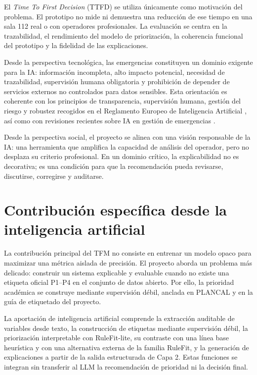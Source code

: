 El \textit{Time To First Decision} (TTFD) se utiliza únicamente como motivación del problema. El prototipo no mide ni demuestra una reducción de ese tiempo en una sala 112 real o con operadores profesionales. La evaluación se centra en la trazabilidad, el rendimiento del modelo de priorización, la coherencia funcional del prototipo y la fidelidad de las explicaciones.

Desde la perspectiva tecnológica, las emergencias constituyen un dominio exigente para la IA: información incompleta, alto impacto potencial, necesidad de trazabilidad, supervisión humana obligatoria y prohibición de depender de servicios externos no controlados para datos sensibles. Esta orientación es coherente con los principios de transparencia, supervisión humana, gestión del riesgo y robustez recogidos en el Reglamento Europeo de Inteligencia Artificial \cite{EUAIAct2024}, así como con revisiones recientes sobre IA en gestión de emergencias \cite{SAPEA2025,Ghaffarian2023}.

Desde la perspectiva social, el proyecto se alinea con una visión responsable de la IA: una herramienta que amplifica la capacidad de análisis del operador, pero no desplaza su criterio profesional. En un dominio crítico, la explicabilidad no es decorativa; es una condición para que la recomendación pueda revisarse, discutirse, corregirse y auditarse.

\section{Contribución específica desde la inteligencia artificial}

La contribución principal del TFM no consiste en entrenar un modelo opaco para maximizar una métrica aislada de precisión. El proyecto aborda un problema más delicado: construir un sistema explicable y evaluable cuando no existe una etiqueta oficial P1--P4 en el conjunto de datos abierto. Por ello, la prioridad académica se construye mediante supervisión débil, anclada en PLANCAL y en la guía de etiquetado del proyecto.

La aportación de inteligencia artificial comprende la extracción auditable de variables desde texto, la construcción de etiquetas mediante supervisión débil, la priorización interpretable con RuleFit-lite, su contraste con una línea base heurística y con una alternativa externa de la familia RuleFit, y la generación de explicaciones a partir de la salida estructurada de Capa 2. Estas funciones se integran sin transferir al LLM la recomendación de prioridad ni la decisión final.

